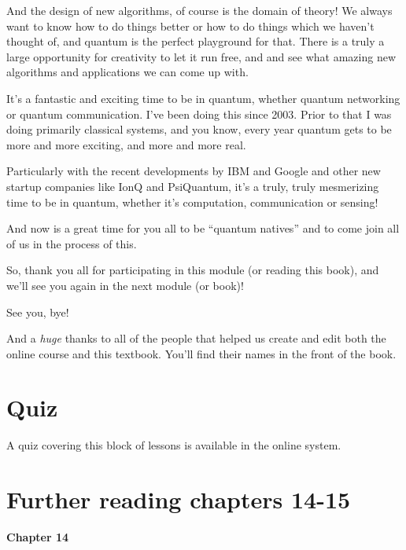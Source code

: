 And the design of new algorithms, of course is the domain of theory! We always want to know how to do things better or how to do things which we haven't thought of, and quantum is the perfect playground for that. There is a truly a large opportunity for creativity to let it run free, and and see what amazing new algorithms and applications we can come up with.

\rrr It's a fantastic and exciting time to be in quantum, whether quantum networking or quantum communication. I've been doing this since 2003. Prior to that I was doing primarily classical systems, and you know, every year quantum gets to be more and more exciting, and more and more real.

\mmm Particularly with the recent developments by IBM and Google and other new startup companies like IonQ and PsiQuantum, it's a truly, truly mesmerizing time to be in quantum, whether it's computation, communication or sensing!

\rrr And now is a great time for you all to be ``quantum natives'' and to come join all of us in the process of this.

So, thank you all for participating in this module (or reading this book), and we'll see you again in the next module (or book)!

\mmm See you, bye!

And a \emph{huge} thanks to all of the people that helped us create and edit both the online course and this textbook.  You'll find their names in the front of the book.



\newpage
\section*{Quiz}

A quiz covering this block of lessons is available in the online system.


\section*{Further reading chapters 14-15}

{\bf Chapter 14}

